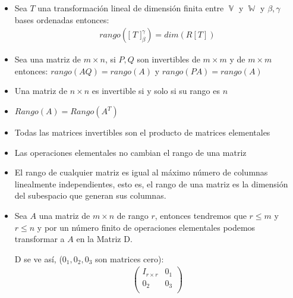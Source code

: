 \documentclass[12pt, fleqn]{report}                             %
\theoremstyle{break}                                            %
\DeclareMathOperator \VectorSet    {\mathbb{V}}                 %
\DeclareMathOperator \SubVectorSet {\mathbb{W}}                 %
\newcommand{\Wrap}[1]           {\left( #1 \right)}             %
\newcommand{\BigBrackets}[1]    {\Big[ \; #1 \; \Big]}          %
\newcommand{\pVector}[1]                                        %
        { \ensuremath{\begin{pmatrix}#1\end{pmatrix}} }             %
\begin{document}
                \begin{itemize}

                    \item
                        Sea $T$ una transformación lineal de dimensión finita entre $\VectorSet$
                        y $\SubVectorSet$ y $\beta, \gamma$ bases ordenadas entonces:
                        \begin{align*}
                            rango\Wrap{\BigBrackets{T}_\beta^\gamma} = dim(R[T])
                        \end{align*}
                    
                    \item 
                        Sea una matriz de $m \times n$, si $P, Q$ son invertibles de $m \times m$
                        y de $m \times m$ entonces:
                        $rango(AQ) = rango(A)$ y $rango(PA) = rango(A)$

                    \item
                        Una matriz de $n \times n$ es invertible si y solo si
                        su rango es $n$

                    \item
                        $Rango(A) = Rango(A^T)$

                    \item
                        Todas las matrices invertibles son el producto de matrices elementales

                    \item
                        Las operaciones elementales no cambian el rango de una matriz

                    \item
                        El rango de cualquier matriz es igual al máximo número de columnas
                        linealmente independientes, esto es, el rango de una matriz
                        es la dimensión del subespacio que generan sus columnas.

                    \item
                        Sea $A$ una matriz de $m \times n$ de rango $r$, entonces
                        tendremos que $r \leq m$ y $r \leq n$
                        y por un número finito de operaciones elementales podemos transformar
                        a $A$ en la Matriz D.

                        D se ve así, ($0_1, 0_2, 0_3$ son matrices cero):
                        \begin{align*}
                            \pVector{
                                I_{r \times r} & 0_1 \\
                                0_2            & 0_3 \\
                            }
                        \end{align*}
                        

\end{itemize}
\end{document}
